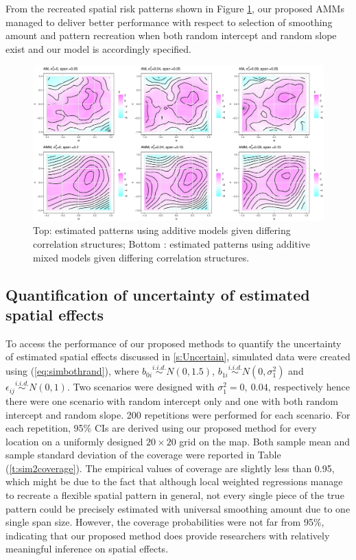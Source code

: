 	From the recreated spatial risk patterns shown in Figure \ref{f:simplotsRIRS}, our proposed AMMs managed to deliver better performance with respect to selection of smoothing amount and pattern recreation when both random intercept and random slope exist and our model is accordingly specified.
	
	\begin{figure}[H]
		\begin{center}
			\includegraphics[width=\linewidth]{Figures/Chap4/WNAR_ests2_h.eps}
		\end{center}
		\caption{Top: estimated patterns using additive models given differing correlation structures; Bottom : estimated patterns using additive mixed models given differing correlation structures.}
		\label{f:simplotsRIRS}
	\end{figure}
	
	
	\subsection{Quantification of uncertainty of estimated spatial effects}
	To access the performance of our proposed methods to quantify the uncertainty of estimated spatial effects discussed in \ref{s:Uncertain}, simulated data were created using (\ref{eq:simbothrand}), where $b_{0i} \stackrel{i.i.d.}{\sim} N(0,1.5)$, $b_{1i} \stackrel{i.i.d.}{\sim} N(0,\sigma_1^2)$ and $\epsilon_{ij} \stackrel{i.i.d.}{\sim} N(0,1)$. Two scenarios were designed with $\sigma_1^2=0,\ 0.04$, respectively hence there were one scenario with random intercept only and one with both random intercept and random slope. 200 repetitions were performed for each scenario. For each repetition, 95\% CIs are derived using our proposed method for every location on a uniformly designed $20\times 20$ grid on the map. Both sample mean and sample standard deviation of the coverage were reported in Table (\ref{t:sim2coverage}). The empirical values of coverage are slightly less than 0.95, which might be due to the fact that although local weighted regressions manage to recreate a flexible spatial pattern in general, not every single piece of the true pattern could be precisely estimated with universal smoothing amount due to one single span size. However, the coverage probabilities were not far from 95\%, indicating that our proposed method does provide researchers with relatively meaningful inference on spatial effects. 
	

